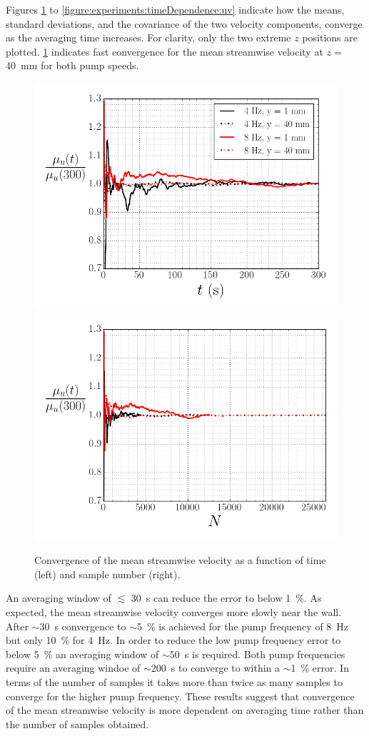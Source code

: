 \documentclass[12pt,oneside,a4paper]{article}
\begin{document}
Figures \ref{figure:experiments:timeDependence:meanUx} to \ref{figure:experiments:timeDependence:uv} indicate how the means, standard deviations, and the covariance of the two velocity components, converge as the averaging time increases. For clarity, only the two extreme $z$ positions are plotted. \ref{figure:experiments:timeDependence:meanUx} indicates fast convergence for the mean streamwise velocity at $z=$\SI{40}{mm} for both pump speeds.
%
\begin{figure}[!h]
\centering
\includegraphics[width=0.5\linewidth]{images/LDA_timeDependenceImages/UxMeanTConvergence.png}\hfill
\includegraphics[width=0.5\linewidth]{images/LDA_timeDependenceImages/UxMeanNConvergence.png}\\
\caption{Convergence of the mean streamwise velocity as a function of time (left) and sample number (right).}
\label{figure:experiments:timeDependence:meanUx}
\end{figure}
%
 An averaging window of $\lesssim$ \SI{30}{s} can reduce the error to below \SI{1}{\%}. As expected, the mean streamwise velocity converges more slowly near the wall. After $\sim$\SI{30}{s} convergence to $\sim$\SI{5}{\%} is achieved for the pump frequency of \SI{8}{Hz} but only \SI{10}{\%} for \SI{4}{Hz}. In order to reduce the low pump frequency error to below \SI{5}{\%} an averaging window of $\sim$\SI{50}{s} is required. Both pump frequencies require an averaging windoe of $\sim$\SI{200}{s} to converge to within a $\sim$\SI{1}{\%} error. In terms of the number of samples it takes more than twice as many samples to converge for the higher pump frequency. These results suggest that convergence of the mean streamwise velocity is more dependent on averaging time rather than the number of samples obtained. 
 
\end{document}
